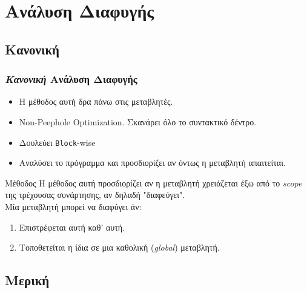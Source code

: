 \documentclass[greek]{beamer}
\begin{document}

\section{Ανάλυση Διαφυγής}
\subsection{Κανονική}

\begin{frame}
\frametitle{\textit{Κανονική} Ανάλυση Διαφυγής}

\begin{itemize}
	\item Η μέθοδος αυτή δρα πάνω στις μεταβλητές.
	\item \textlatin{Non-Peephole Optimization.} Σκανάρει όλο το συντακτικό δέντρο.
	\item Δουλεύει \textlatin{\texttt{Block}}-\textlatin{wise}
	\item Αναλύσει το πρόγραμμα και προσδιορίζει αν όντως η μεταβλητή απαιτείται.
\end{itemize}

\begin{block}{Μέθοδος}
Η μέθοδος αυτή προσδιορίζει αν η μεταβλητή χρειάζεται έξω από το \textit{\textlatin{scope}}
της τρέχουσας συνάρτησης, αν δηλαδή "διαφεύγει".\\
\vspace{3mm}
Μία μεταβλητή μπορεί να διαφύγει άν:
\begin{enumerate}
	\item Επιστρέφεται αυτή καθ' αυτή.
   	\item Τοποθετείται η ίδια σε μια καθολική (\textit{\textlatin{global}}) μεταβλητή.
\end{enumerate}
\end{block}

\end{frame}


\subsection{Μερική}
\end{document}
